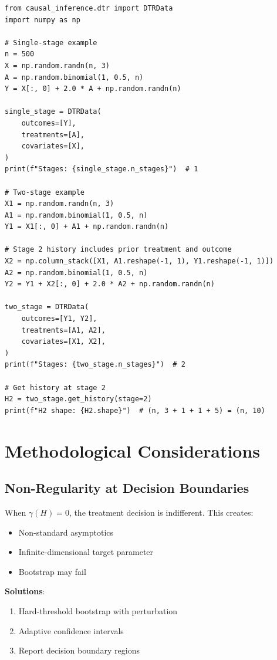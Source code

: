 \begin{verbatim}
from causal_inference.dtr import DTRData
import numpy as np

# Single-stage example
n = 500
X = np.random.randn(n, 3)
A = np.random.binomial(1, 0.5, n)
Y = X[:, 0] + 2.0 * A + np.random.randn(n)

single_stage = DTRData(
    outcomes=[Y],
    treatments=[A],
    covariates=[X],
)
print(f"Stages: {single_stage.n_stages}")  # 1

# Two-stage example
X1 = np.random.randn(n, 3)
A1 = np.random.binomial(1, 0.5, n)
Y1 = X1[:, 0] + A1 + np.random.randn(n)

# Stage 2 history includes prior treatment and outcome
X2 = np.column_stack([X1, A1.reshape(-1, 1), Y1.reshape(-1, 1)])
A2 = np.random.binomial(1, 0.5, n)
Y2 = Y1 + X2[:, 0] + 2.0 * A2 + np.random.randn(n)

two_stage = DTRData(
    outcomes=[Y1, Y2],
    treatments=[A1, A2],
    covariates=[X1, X2],
)
print(f"Stages: {two_stage.n_stages}")  # 2

# Get history at stage 2
H2 = two_stage.get_history(stage=2)
print(f"H2 shape: {H2.shape}")  # (n, 3 + 1 + 1 + 5) = (n, 10)
\end{verbatim}


\section{Methodological Considerations}

\subsection{Non-Regularity at Decision Boundaries}

When $\gamma(H) = 0$, the treatment decision is indifferent. This creates:
\begin{itemize}
\item Non-standard asymptotics
\item Infinite-dimensional target parameter
\item Bootstrap may fail
\end{itemize}

\textbf{Solutions}:
\begin{enumerate}
\item Hard-threshold bootstrap with perturbation
\item Adaptive confidence intervals
\item Report decision boundary regions
\end{enumerate}

